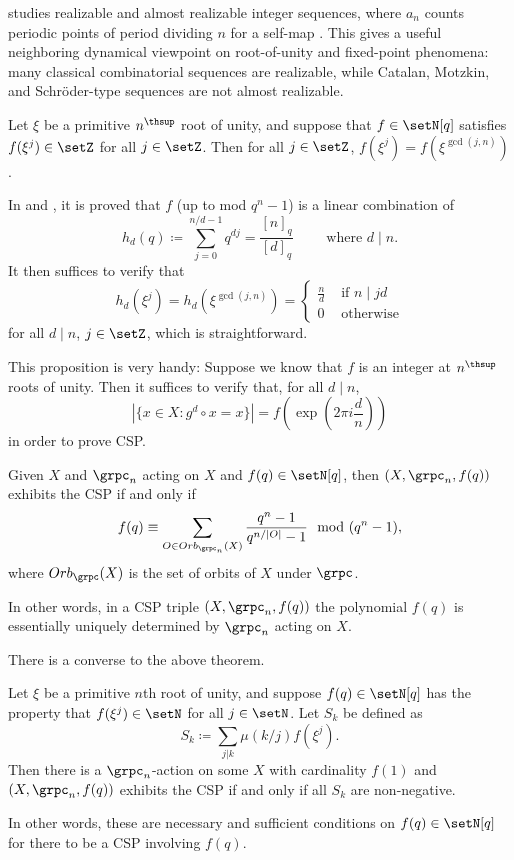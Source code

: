  studies realizable and almost realizable
integer sequences, where $a_n$ counts periodic points of period dividing $n$
for a self-map \cite{Zhang2024Realizable}.  This gives a useful neighboring
dynamical viewpoint on root-of-unity and fixed-point phenomena: many classical
combinatorial sequences are realizable, while Catalan, Motzkin, and
Schröder-type sequences are not almost realizable.


\begin{proposition}
Let $\xi$ be a primitive $n^\thsup$ root of unity,
and suppose that $f \in \setN[q]$ satisfies $f(\xi^j) \in \setZ$ for all $j \in \setZ$.
Then for all $j \in \setZ$, $f(\xi^j) = f( \xi^{\gcd(j,n)})$.
\end{proposition}
\begin{proof*}
In \cite{Desarmenien1989} and \cite[Lem. 2.2]{AlexanderssonAmini2018}, 
it is proved that $f$ (up to mod $q^n-1$) is a linear combination of 
\[
 h_d(q) \coloneqq \sum_{j=0}^{n/d-1} q^{dj}  = \frac{[n]_q}{[d]_q} \qquad \text{ where } d \mid n.
\]
It then suffices to verify that 
\[
h_d(\xi^j) = h_d( \xi^{\gcd(j,n)})
=
\begin{cases}
\frac{n}{d} &\text{ if } n \mid j d \\
0 &\text{ otherwise}
\end{cases}
\]
for all $d \mid n$, $j\in \setZ$, which is straightforward.
\end{proof*}
This proposition is very handy: Suppose we know that $f$ is an integer at $n^\thsup$ roots of unity.
Then it suffices to verify that, for all $d \mid n$,
\[
|\{x \in X : g^d \circ x =x \}| = f\left(\exp\left(2\pi i  \frac{d}{n}\right)\right)
\]
in order to prove CSP.



\begin{theorem}

Given $X$ and $\grpc_n$ acting on $X$ and $f(q) \in \setN[q]$,
then $(X,\grpc_n,f(q))$ exhibits the CSP if and only if 
\[
f(q) \equiv \sum_{O \in Orb_{\grpc_n}(X)} \frac{q^n-1}{ q^{n/|O|} - 1} \mod (q^n-1),
\]
where $Orb_\grpc(X)$ is the set of orbits of $X$ under $\grpc$.

In other words, in a CSP triple $(X,\grpc_n,f(q))$ 
the polynomial $f(q)$ is essentially uniquely determined by $\grpc_n$ acting on $X$.
\end{theorem}

There is a converse to the above theorem.
\begin{theorem}

Let $\xi$ be a primitive $n$th root of unity,
and suppose $f(q) \in \setN[q]$ has the property that $f(\xi^j) \in \setN$ for all $j\in \setN$.
Let $S_k$ be defined as
\[
S_k \coloneqq \sum_{j|k} \mu(k/j) f(\xi^j).
\]
Then there is a $\grpc_n$-action on some $X$ with cardinality $f(1)$
and $(X,\grpc_n,f(q))$ exhibits the CSP if and only if all $S_k$ are non-negative.

In other words, these are necessary and sufficient conditions on $f(q) \in \setN[q]$
for there to be a CSP involving $f(q)$.
\end{theorem}

